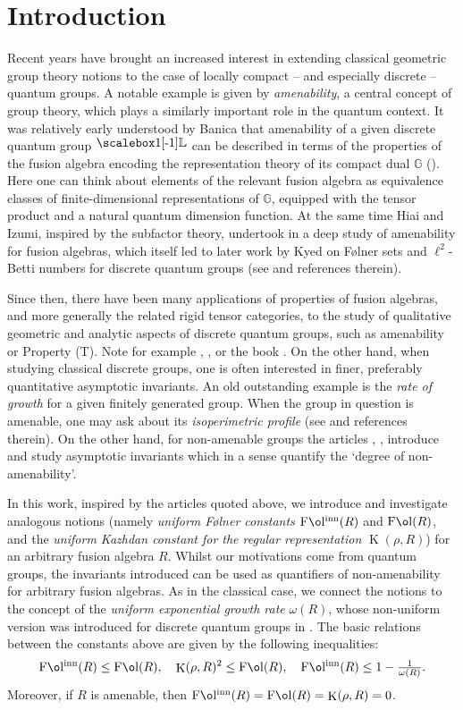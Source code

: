 \documentclass[11 pt, leqno]{amsart}
\newcommand{\bbGamma}{{\mathpalette\makebbGamma\relax}}
\newcommand{\makebbGamma}[2]{%
  \raisebox{\depth}{\scalebox{1}[-1]{$\mathsurround=0pt#1\mathbb{L}$}}%
}
\newcommand{\GG}{\mathbb{G}}
\DeclareMathOperator{\Fol}{F\mathrm{\o}l}
\DeclareMathOperator{\Folinn}{F\mathrm{\o}l^{inn}}
\DeclareMathOperator{\Kaz}{K}
\theoremstyle{definition}
\numberwithin{equation}{section}
\begin{document}
\section{Introduction}
Recent years have brought an increased interest in extending classical geometric group theory notions to the case of locally compact -- and especially discrete -- quantum groups. A notable example is given by \emph{amenability}, a central concept of group theory, which plays a similarly important role in the quantum context. It was relatively early understood by Banica that amenability of a given discrete quantum group $\bbGamma$ can be described in terms of the properties of the fusion algebra encoding the representation theory of its compact dual $\GG$ (\cite[Theorem 6.2]{BanicaCrelle}). Here one can think about elements of the relevant fusion algebra as equivalence classes of finite-dimensional representations of $\GG$, equipped with the tensor product and a natural quantum dimension function. At the same time Hiai and Izumi, inspired by the subfactor theory, undertook in \cite{HiaiIzumi} a deep study of amenability for fusion algebras, which itself led to later work by Kyed on F\o lner sets and $\ell^2$-Betti numbers for discrete quantum groups (see \cite{Kyed} and references therein).

Since then, there have been many applications of properties of fusion algebras, and more generally the related rigid tensor categories, to the study of qualitative geometric and analytic aspects of discrete quantum groups, such as amenability or Property (T). Note for example \cite{PopaVaes}, \cite{SergeyMakoto}, \cite{KRVV} or the book \cite{NeshveyevTuset}. On the other hand, when studying classical discrete groups, one is often interested in finer, preferably quantitative asymptotic invariants. An old outstanding example is the \emph{rate of  growth} for a given finitely generated group.  When the group in question is amenable, one may ask about its \emph{isoperimetric profile} (see \cite{Erschler} and references therein). On the other hand, for non-amenable groups  the articles  \cite{Arzhantseva}, \cite{LPV}, \cite{Shalom} introduce and study asymptotic invariants which in a sense quantify the `degree of non-amenability'.

In this work, inspired by the articles quoted above, we introduce and investigate analogous notions (namely \emph{uniform F\o lner constants}   $\Folinn(R)$ and $\Fol(R)$, and the \emph{uniform Kazhdan constant for the regular representation} $\Kaz(\rho, R)$) for an arbitrary fusion algebra $R$. Whilst our motivations come from quantum groups, the invariants introduced can be used as quantifiers of non-amenability for arbitrary fusion algebras. As in the classical case, we connect the notions to the concept of the \emph{uniform exponential growth rate} $\omega(R)$, whose non-uniform version was introduced for discrete quantum groups in \cite{BanicaVergnioux}. The basic relations between the constants above are given by the following inequalities:
\[ 
\Folinn(R)\le \Fol(R),\quad \Kaz(\rho,R)^2\le 
 \Fol(R) ,\quad \Folinn(R)\le 1-\tfrac{1}{\omega(R)}. 
\]
Moreover, if $R$ is amenable, then $\Folinn(R) = \Fol(R) = \Kaz(\rho,R) =0$. 
\end{document}
